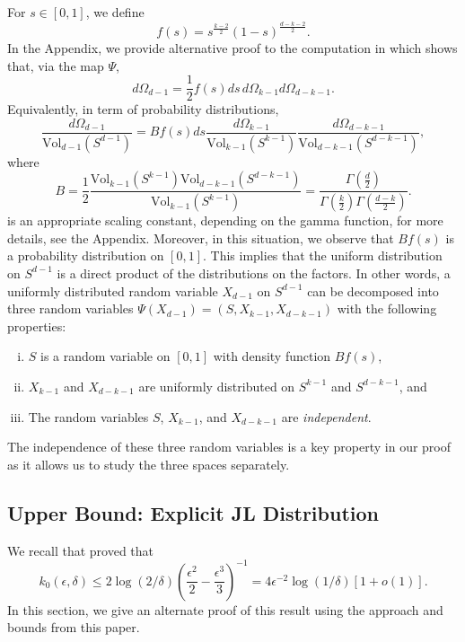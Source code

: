 \documentclass[twoside,11pt]{article}
\newcommand{\VV}[2]{\text{Vol}_{#2}\left( #1 \right)}
\begin{document}
 For $s \in [0,1]$, we define
 \[ f(s) =  s^{\frac{k-2}{2}}(1-s)^{\frac{d-k-2}{2}}.\]
 In the Appendix, we provide alternative proof to the computation in \cite{KaneNelsonMeka} which shows that, via the map $\Psi$, 
  \[ d\Omega_{d-1} = \frac{1}{2} f(s)ds\, d\Omega_{k-1} d\Omega_{d-k-1}.\]
  Equivalently,  in term of probability distributions,
\begin{equation}\label{eq:equalitymeasures}
  \frac{d\Omega_{d-1}}{\VV{S^{d-1}}{d-1}} =  B f(s) ds \frac{d\Omega_{k-1}}{\VV{S^{k-1}}{k-1}} \frac{d\Omega_{d-k-1}}{\VV{S^{d-k-1}}{d-k-1}},
  \end{equation}
 where 
 $$
B = \frac{1}{2} \frac{\VV{S^{k-1}}{k-1} \VV{S^{d-k-1}}{d-k-1}}{\VV{S^{k-1}}{k-1}} = 
  \frac{\Gamma(\frac{d}{2})}{\Gamma(\frac{k}{2}) \Gamma(\frac{d-k}{2})}. 
$$ is an appropriate scaling constant, depending on the gamma function, for more details, see the Appendix.  Moreover, in this situation, we observe that $Bf(s)$ is a probability distribution on $[0,1]$.  This implies that the uniform distribution on $S^{d-1}$ is a direct product of the distributions on the factors.  In other words, a uniformly distributed random variable $X_{d-1}$ on $S^{d-1}$ can be decomposed into three random variables $\Psi(X_{d-1})=(S,X_{k-1},X_{d-k-1})$ with the following properties:
\begin{enumerate}[(i)]
\item $S$ is a random variable on $[0,1]$ with density function $Bf(s)$,
\item $X_{k-1}$ and $X_{d-k-1}$ are uniformly distributed on $S^{k-1}$ and $S^{d-k-1}$, and
\item The random variables $S$, $X_{k-1}$, and $X_{d-k-1}$ are {\em independent}.
\end{enumerate}
The independence of these three random variables is a key property in our proof as it allows us to study the three spaces separately.

\subsection{Upper Bound: Explicit JL Distribution} \label{Sec: OrthogProj}

We recall that \cite{Achlioptas} proved that 
\[k_0(\epsilon, \delta)   \leq  2 \log(2/\delta) \left(\frac{\epsilon^2}{2} - \frac{\epsilon^3}{3} \right)^{-1} = 4\epsilon^{-2} \log(1/\delta) \left[ 1+ o(1) \right].\]
In this section, we give an alternate proof of this result using the approach and bounds from this paper.
\end{document}
